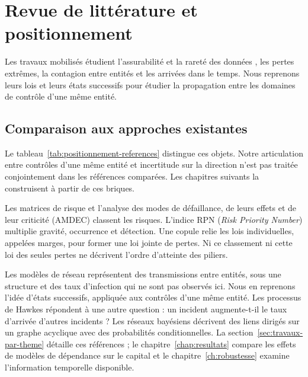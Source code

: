 ﻿%
\chapter{Revue de littérature et positionnement}
\label{ch:positionnement}


Les travaux mobilisés étudient l'assurabilité et la rareté des données
\citep{BienerElingWirfs2015}, les pertes extrêmes, la contagion entre entités et les arrivées dans
le temps. Nous reprenons leurs lois et leurs états successifs pour étudier la propagation entre
les domaines de contrôle d'une même entité.

\section{Comparaison aux approches existantes}

Le tableau~\ref{tab:positionnement-references} distingue ces objets. Notre articulation entre
contrôles d'une même entité et incertitude sur la direction n'est pas traitée conjointement dans
les références comparées. Les chapitres suivants la construisent à partir de ces briques.



Les matrices de risque et l'analyse des modes de défaillance, de leurs effets et de leur criticité
(AMDEC) classent les risques. L'indice RPN (\emph{Risk Priority Number}) multiplie gravité, occurrence et détection. Une copule relie les lois individuelles, appelées marges, pour former une loi jointe de pertes. Ni ce classement ni cette loi des seules pertes
ne décrivent l'ordre d'atteinte des piliers.

Les modèles de réseau représentent des transmissions entre entités, sous une structure et des
taux d'infection qui ne sont pas observés ici. Nous en reprenons l'idée d'états successifs,
appliquée aux contrôles d'une même entité. Les processus de Hawkes répondent à une autre question :
un incident augmente-t-il le taux d'arrivée d'autres incidents ? Les réseaux bayésiens décrivent
des liens dirigés sur un graphe acyclique avec des probabilités conditionnelles.
La section~\ref{sec:travaux-par-theme} détaille ces références ; le chapitre~\ref{chap:resultats} compare les effets de
modèles de dépendance sur le capital et le chapitre~\ref{ch:robustesse} examine l'information temporelle disponible.

